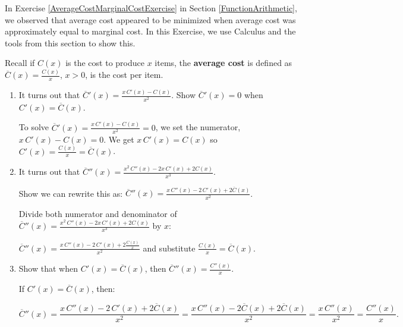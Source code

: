 \documentclass{ximera}
\begin{document}
\begin{problem} \label{MinimizeAverageCostProofExercise} 
In Exercise \ref{AverageCostMarginalCostExercise} in Section \ref{FunctionArithmetic}, we observed that average cost appeared to be minimized when average cost was approximately equal to marginal cost.  In this Exercise, we use Calculus and the tools from this section to show this. 

 Recall if $C(x)$ is the cost to produce $x$ items, the \textbf{average cost} is defined as $\overline{C}(x) = \frac{C(x)}{x}$, $x > 0$,  is the cost per item. 
\begin{enumerate}

\item\label{avgcostcostderivequal}  It turns out that $\overline{C}'(x) = \frac{x \, C'(x) - C(x)}{x^2}$.  Show  $\overline{C}'(x) = 0$ when $C'(x) = \overline{C}(x)$.

\begin{solution}
To solve $\overline{C}'(x) = \frac{x \, C'(x) - C(x)}{x^2} = 0$, we set the numerator,  $x \, C'(x) - C(x) = 0$. We get  $x \, C'(x)  = C(x)$ so $C'(x) = \frac{C(x)}{x} = \overline{C}(x)$.
\end{solution}



\item  It turns out that $\overline{C}''(x) = \frac{x^2 \, C''(x) - 2x\, C'(x) + 2C(x)}{x^3}$. 

Show we can rewrite this as: $\overline{C}''(x) = \frac{x \, C''(x) - 2\, C'(x) + 2 \overline{C}(x)}{x^2}$.

\begin{solution}

Divide both numerator and denominator of  $\overline{C}''(x) = \frac{x^2 \, C''(x) - 2x\, C'(x) + 2C(x)}{x^3}$ by $x$: 

$\overline{C}''(x) = \frac{x \, C''(x) - 2 \, C'(x) + 2\frac{C(x)}{x}}{x^2}$ and substitute  $\frac{C(x)}{x} = \overline{C}(x)$.

\end{solution}


\item\label{reduceavgcostseconderiv}  Show that when $C'(x) = \overline{C}(x)$, then $\overline{C}''(x)  = \frac{C''(x)}{x}$.

\begin{solution}
If  $C'(x) = \overline{C}(x)$, then:

 \[\overline{C}''(x)  = \frac{x\, C''(x) - 2\, C'(x) + 2\overline{C}(x)}{x^2} =  \frac{x\, C''(x) - 2\overline{C} (x) + 2\overline{C}(x)}{x^2}= \frac{x\, C''(x)}{x^2} =  \frac{C''(x)}{x}.\]


\end{solution}
\end{enumerate}
\end{problem}
\end{document}

